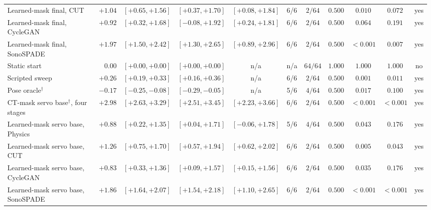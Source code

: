 \begin{table}[tp]
\begin{tabular}{@{}l r c c c c c c c c c@{}}
\quad Learned-mask final, CUT & $+1.04$ & $[+0.65, +1.56]$ & $[+0.37, +1.70]$ & $[+0.08, +1.84]$ & 6/6 & $2/64$ & $0.500$ & $0.010$ & $0.072$ & yes \\
\quad Learned-mask final, CycleGAN & $+0.92$ & $[+0.32, +1.68]$ & $[-0.08, +1.92]$ & $[+0.24, +1.81]$ & 6/6 & $2/64$ & $0.500$ & $0.064$ & $0.191$ & yes \\
\quad Learned-mask final, SonoSPADE & $+1.97$ & $[+1.50, +2.42]$ & $[+1.30, +2.65]$ & $[+0.89, +2.96]$ & 6/6 & $2/64$ & $0.500$ & $<0.001$ & $0.007$ & yes \\
\quad Static start & $0.00$ & $[+0.00, +0.00]$ & $[+0.00, +0.00]$ & n/a & n/a & $64/64$ & $1.000$ & $1.000$ & $1.000$ & no \\
\quad Scripted sweep & $+0.26$ & $[+0.19, +0.33]$ & $[+0.16, +0.36]$ & n/a & 6/6 & $2/64$ & $0.500$ & $0.001$ & $0.011$ & yes \\
\quad Pose oracle$^{\dagger}$ & $-0.17$ & $[-0.25, -0.08]$ & $[-0.29, -0.05]$ & n/a & 5/6 & $4/64$ & $0.500$ & $0.017$ & $0.100$ & yes \\
\quad CT-mask servo base$^{\dagger}$, four stages & $+2.98$ & $[+2.63, +3.29]$ & $[+2.51, +3.45]$ & $[+2.23, +3.66]$ & 6/6 & $2/64$ & $0.500$ & $<0.001$ & $<0.001$ & yes \\
\quad Learned-mask servo base, Physics & $+0.88$ & $[+0.22, +1.35]$ & $[+0.04, +1.71]$ & $[-0.06, +1.78]$ & 5/6 & $4/64$ & $0.500$ & $0.043$ & $0.176$ & yes \\
\quad Learned-mask servo base, CUT & $+1.26$ & $[+0.75, +1.70]$ & $[+0.57, +1.94]$ & $[+0.62, +2.02]$ & 6/6 & $2/64$ & $0.500$ & $0.005$ & $0.043$ & yes \\
\quad Learned-mask servo base, CycleGAN & $+0.83$ & $[+0.33, +1.36]$ & $[+0.09, +1.57]$ & $[+0.15, +1.56]$ & 6/6 & $2/64$ & $0.500$ & $0.035$ & $0.176$ & yes \\
\quad Learned-mask servo base, SonoSPADE & $+1.86$ & $[+1.64, +2.07]$ & $[+1.54, +2.18]$ & $[+1.10, +2.65]$ & 6/6 & $2/64$ & $0.500$ & $<0.001$ & $<0.001$ & yes \\
\bottomrule
\end{tabular}
\end{table}
